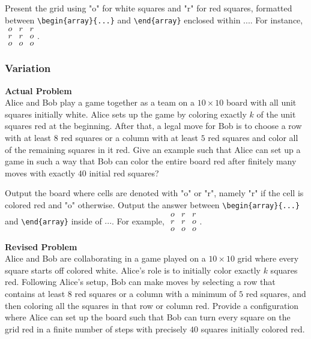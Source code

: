 Present the grid using "o" for white squares and "r" for red squares, formatted between \verb|\begin{array}{...}| and \verb|\end{array}| enclosed within $\boxed{...}$. For instance, $\boxed{\begin{array}{ccc}o & r & r \\ r & r & o \\ o & o & o\end{array}}$.

\subsubsection{Variation}
\textbf{Actual Problem}\\
Alice and Bob play a game together as a team on a $10 \times 10$ board with all unit squares initially white. Alice sets up the game by coloring exactly $k$ of the unit squares red at the beginning. After that, a legal move for Bob is to choose a row with at least $8$ red squares or a column with at least $5$ red squares and color all of the remaining squares in it red. Give an example such that Alice can set up a game in such a way that Bob can color the entire board red after finitely many moves with exactly $40$ initial red squares?

Output the board where cells are denoted with "o" or "r", namely "r" if the cell is colored red and "o" otherwise. Output the answer between \verb|\begin{array}{...}| and \verb|\end{array}| inside of $\boxed{...}$. For example, $\boxed{\begin{array}{ccc}o & r & r \\ r & r & o \\ o & o & o\end{array}}$.

\textbf{Revised Problem}\\
Alice and Bob are collaborating in a game played on a $10 \times 10$ grid where every square starts off colored white. Alice's role is to initially color exactly $k$ squares red. Following Alice's setup, Bob can make moves by selecting a row that contains at least $8$ red squares or a column with a minimum of $5$ red squares, and then coloring all the squares in that row or column red. Provide a configuration where Alice can set up the board such that Bob can turn every square on the grid red in a finite number of steps with precisely $40$ squares initially colored red.

